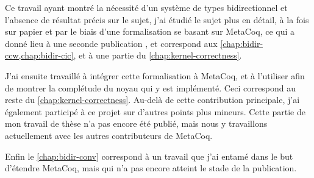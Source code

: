 Ce travail ayant montré la nécessité d’un système de types bidirectionnel
et l’absence de résultat précis sur le sujet, j’ai
étudié le sujet plus en détail, à la fois sur papier et par le biais d’une
formalisation se basant sur MetaCoq, ce qui a donné lieu à une seconde publication
, et correspond aux
\cref{chap:bidir-ccw,chap:bidir-cic}, et à une partie du
\cref{chap:kernel-correctness}.

J’ai ensuite travaillé à intégrer cette formalisation à
MetaCoq, et à l’utiliser afin de montrer la complétude du noyau
qui y est implémenté. Ceci correspond au reste du \cref{chap:kernel-correctness}.
Au-delà de cette contribution principale,
j’ai également participé à ce projet sur d’autres points plus mineurs.
Cette partie de mon travail de thèse n’a pas encore été publié, mais nous y
travaillons actuellement avec les autres contributeurs de MetaCoq.

Enfin le \cref{chap:bidir-conv} correspond à un travail que j’ai entamé dans
le but d’étendre MetaCoq, mais qui n’a pas encore atteint le stade de la
publication.